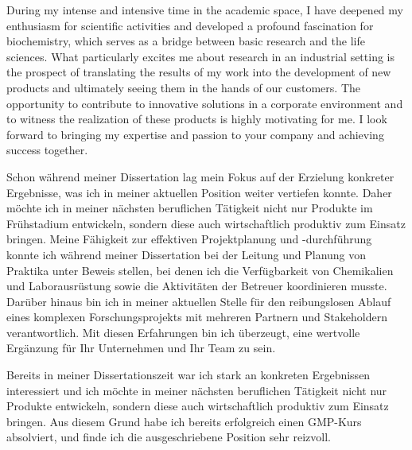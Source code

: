     {During my intense and intensive time in the academic space, I have deepened my enthusiasm for scientific activities and developed a profound fascination for biochemistry, which serves as a bridge between basic research and the life sciences. What particularly excites me about research in an industrial setting is the prospect of translating the results of my work into the development of new products and ultimately seeing them in the hands of our customers. The opportunity to contribute to innovative solutions in a corporate environment and to witness the realization of these products is highly motivating for me. I look forward to bringing my expertise and passion to your company and achieving success together.}{}
    {Schon während meiner Dissertation lag mein Fokus auf der Erzielung konkreter Ergebnisse, was ich in meiner aktuellen Position weiter vertiefen konnte. Daher möchte ich in meiner nächsten beruflichen Tätigkeit nicht nur Produkte im Frühstadium entwickeln, sondern diese auch wirtschaftlich produktiv zum Einsatz bringen. Meine Fähigkeit zur effektiven Projektplanung und -durchführung konnte ich während meiner Dissertation bei der Leitung und Planung von Praktika unter Beweis stellen, bei denen ich die Verfügbarkeit von Chemikalien und Laborausrüstung sowie die Aktivitäten der Betreuer koordinieren musste. Darüber hinaus bin ich in meiner aktuellen Stelle für den reibungslosen Ablauf eines komplexen Forschungsprojekts mit mehreren Partnern und Stakeholdern verantwortlich. Mit diesen Erfahrungen bin ich überzeugt, eine wertvolle Ergänzung für Ihr Unternehmen und Ihr Team zu sein.
    \par }{}
    {Bereits in meiner Dissertationszeit war ich stark an konkreten Ergebnissen interessiert und ich möchte in meiner nächsten beruflichen Tätigkeit nicht nur Produkte entwickeln, sondern diese auch wirtschaftlich produktiv zum Einsatz bringen. Aus diesem Grund habe ich bereits erfolgreich einen GMP-Kurs absolviert, und finde ich die ausgeschriebene Position sehr reizvoll.\par }{}
